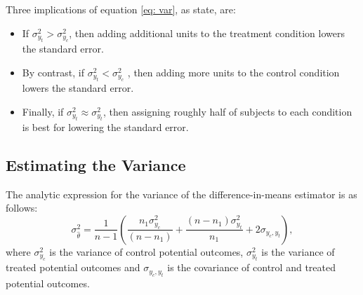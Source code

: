 \documentclass[12pt,leqno]{article}
\theoremstyle{newstyle}
\begin{document}
Three implications of equation \eqref{eq: var}, as
\citet[58]{gerbergreen2012} state, are:

\begin{itemize}
\item If $\sigma^2_{y_t} > \sigma^2_{y_c}$, then adding additional units to the treatment condition lowers the standard error. 

\item By contrast, if $\sigma^2_{y_t} < \sigma^2_{y_c}$ , then adding more units to the control condition lowers the standard error. 

\item Finally, if $\sigma^2_{y_t} \approx \sigma^2_{y_t}$, then assigning roughly half of subjects to each condition is best for lowering the standard error.
\end{itemize}

\subsection{Estimating the Variance}

The analytic expression for the variance of the difference-in-means
estimator is as follows: \begin{equation*}
\sigma^2_{\hat{\theta}} = \frac{1}{n - 1}\left(\frac{n_1 \sigma^2_{y_c}}{\left(n - n_1\right)} + \frac{\left(n - n_1\right) \sigma^2_{y_t}}{n_1} + 2\sigma_{y_c, y_t}\right),
\end{equation*} where \(\sigma^2_{y_c}\) is the variance of control
potential outcomes, \(\sigma^2_{y_t}\) is the variance of treated
potential outcomes and \(\sigma_{y_c, y_t}\) is the covariance of
control and treated potential outcomes.
\end{document}
